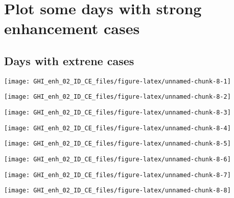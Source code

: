 \documentclass[
  10pt,
  a4paper,oneside]{article}
\begin{document}
\FloatBarrier

\hypertarget{plot-some-days-with-strong-enhancement-cases}{%
\section{Plot some days with strong enhancement cases}\label{plot-some-days-with-strong-enhancement-cases}}

\FloatBarrier

\hypertarget{days-with-extrene-cases}{%
\subsection{Days with extrene cases}\label{days-with-extrene-cases}}

\begin{center}\texttt{[image: GHI\_enh\_02\_ID\_CE\_files/figure-latex/unnamed-chunk-8-1]} \end{center}

\begin{center}\texttt{[image: GHI\_enh\_02\_ID\_CE\_files/figure-latex/unnamed-chunk-8-2]} \end{center}

\begin{center}\texttt{[image: GHI\_enh\_02\_ID\_CE\_files/figure-latex/unnamed-chunk-8-3]} \end{center}

\begin{center}\texttt{[image: GHI\_enh\_02\_ID\_CE\_files/figure-latex/unnamed-chunk-8-4]} \end{center}

\begin{center}\texttt{[image: GHI\_enh\_02\_ID\_CE\_files/figure-latex/unnamed-chunk-8-5]} \end{center}

\begin{center}\texttt{[image: GHI\_enh\_02\_ID\_CE\_files/figure-latex/unnamed-chunk-8-6]} \end{center}

\begin{center}\texttt{[image: GHI\_enh\_02\_ID\_CE\_files/figure-latex/unnamed-chunk-8-7]} \end{center}

\begin{center}\texttt{[image: GHI\_enh\_02\_ID\_CE\_files/figure-latex/unnamed-chunk-8-8]} \end{center}
\end{document}
